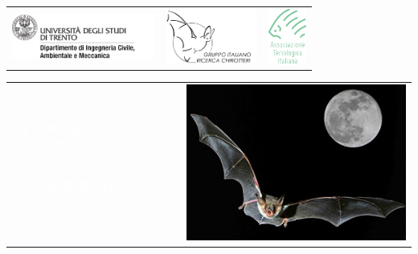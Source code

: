 \documentclass[final,italian]{memoir}
\begin{document}
\pagestyle{empty}
\pagecolor{black}\afterpage{\nopagecolor}

\begin{tcolorbox}[size=tight,oversize,
  sharp corners,
  colback=white,
  colframe=white,
  left=56pt,
  right=90pt,
  top=10pt,
  fontupper=\Huge]
\begin{tabular*}{200mm}[t]{lcr}
\includegraphics[height=15mm]{logo_DICAM_web_1.jpg} &
\includegraphics[height=18mm]{logotipo_girc_300dpi_10cm.png} &
\includegraphics[height=18mm]{Logo_ATIt_ritaglio.png} \\
\end{tabular*}
\end{tcolorbox}
\vspace{50mm}
\flushleft
\begin{tabular}{p{110mm}p{40mm}}
   & \multirow{7}{*}{\includegraphics[width=75mm]{bat_moon.png}} \\
   & \\
   & \\
   \sffamily\fontsize{30}{30}\selectfont\textcolor{white}{\textbf{III CONVEGNO ITALIANO}} & \\ [2mm]
   \sffamily\fontsize{30}{30}\selectfont\textcolor{white}{\textbf{SUI CHIROTTERI}} & \\ [3mm]
   \sffamily\huge\textcolor{white}{Trento, 9-11 ottobre 2015} & \\
   & \\
\end{tabular}
\end{document}
